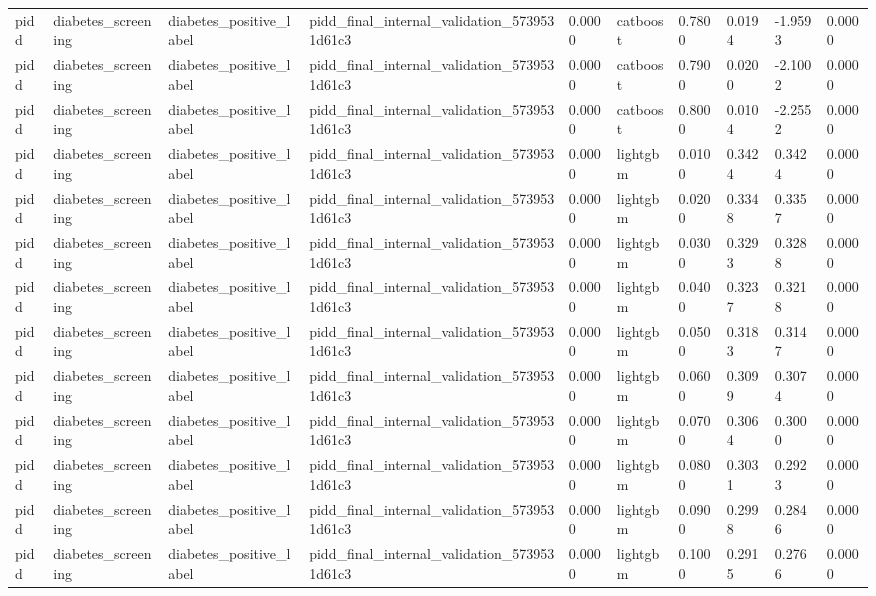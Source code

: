\begin{tabular}{llllllllll}
pidd & diabetes\_screening & diabetes\_positive\_label & pidd\_final\_internal\_validation\_5739531d61c3 & 0.0000 & catboost & 0.7800 & 0.0194 & -1.9593 & 0.0000 \\
pidd & diabetes\_screening & diabetes\_positive\_label & pidd\_final\_internal\_validation\_5739531d61c3 & 0.0000 & catboost & 0.7900 & 0.0200 & -2.1002 & 0.0000 \\
pidd & diabetes\_screening & diabetes\_positive\_label & pidd\_final\_internal\_validation\_5739531d61c3 & 0.0000 & catboost & 0.8000 & 0.0104 & -2.2552 & 0.0000 \\
pidd & diabetes\_screening & diabetes\_positive\_label & pidd\_final\_internal\_validation\_5739531d61c3 & 0.0000 & lightgbm & 0.0100 & 0.3424 & 0.3424 & 0.0000 \\
pidd & diabetes\_screening & diabetes\_positive\_label & pidd\_final\_internal\_validation\_5739531d61c3 & 0.0000 & lightgbm & 0.0200 & 0.3348 & 0.3357 & 0.0000 \\
pidd & diabetes\_screening & diabetes\_positive\_label & pidd\_final\_internal\_validation\_5739531d61c3 & 0.0000 & lightgbm & 0.0300 & 0.3293 & 0.3288 & 0.0000 \\
pidd & diabetes\_screening & diabetes\_positive\_label & pidd\_final\_internal\_validation\_5739531d61c3 & 0.0000 & lightgbm & 0.0400 & 0.3237 & 0.3218 & 0.0000 \\
pidd & diabetes\_screening & diabetes\_positive\_label & pidd\_final\_internal\_validation\_5739531d61c3 & 0.0000 & lightgbm & 0.0500 & 0.3183 & 0.3147 & 0.0000 \\
pidd & diabetes\_screening & diabetes\_positive\_label & pidd\_final\_internal\_validation\_5739531d61c3 & 0.0000 & lightgbm & 0.0600 & 0.3099 & 0.3074 & 0.0000 \\
pidd & diabetes\_screening & diabetes\_positive\_label & pidd\_final\_internal\_validation\_5739531d61c3 & 0.0000 & lightgbm & 0.0700 & 0.3064 & 0.3000 & 0.0000 \\
pidd & diabetes\_screening & diabetes\_positive\_label & pidd\_final\_internal\_validation\_5739531d61c3 & 0.0000 & lightgbm & 0.0800 & 0.3031 & 0.2923 & 0.0000 \\
pidd & diabetes\_screening & diabetes\_positive\_label & pidd\_final\_internal\_validation\_5739531d61c3 & 0.0000 & lightgbm & 0.0900 & 0.2998 & 0.2846 & 0.0000 \\
pidd & diabetes\_screening & diabetes\_positive\_label & pidd\_final\_internal\_validation\_5739531d61c3 & 0.0000 & lightgbm & 0.1000 & 0.2915 & 0.2766 & 0.0000 \\

\end{tabular}
